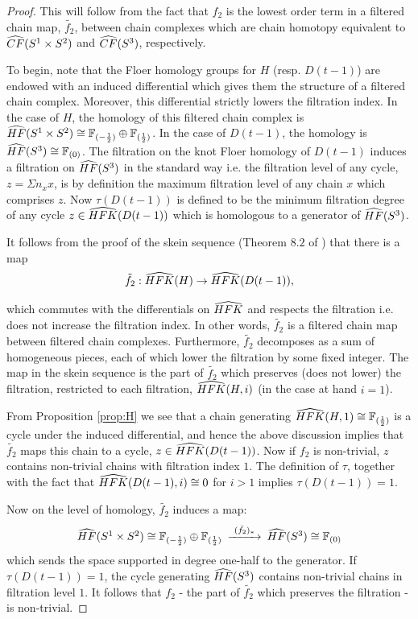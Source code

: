 \begin{proof} This will follow from the fact that $f_2$ is the lowest order term in a filtered chain map, $\tilde{f_2}$, between chain complexes which are chain homotopy equivalent to $\widehat{CF}(S^1\times S^2)$ and $\widehat{CF}(S^3)$, respectively.
	
To begin, note that the Floer homology groups for $H$ (resp. $D(t-1)$) are endowed with an induced differential which gives them the structure of a filtered chain complex. Moreover, this differential strictly lowers the filtration index. In the case of $H$, the homology of this filtered chain complex is  $\widehat{HF}(S^1\times S^2)\cong \mathbb F_{(-\frac{1}{2})}\oplus \mathbb F_{(\frac{1}{2})}$.  In the case of $D(t-1)$, the homology is $\widehat{HF}(S^3)\cong \mathbb F_{(0)}$.  The filtration on the knot Floer homology of $D(t-1)$ induces a filtration on $\widehat{HF}(S^3)$ in the standard way i.e. the filtration level of any cycle, $z = \Sigma n_x x$, is by definition the maximum filtration level of any chain $x$ which comprises $z$.   Now $\tau(D(t-1))$ is defined to be the minimum filtration degree of any cycle $z\in \widehat{HFK}(D(t-1))$ which is homologous to a generator of $\widehat{HF}(S^3)$.  

It follows from the proof of the skein sequence (Theorem $8.2$ of \cite{Knots}) that there is a map $$\tilde{f_2} :\widehat{HFK}(H) \rightarrow \widehat{HFK}(D(t-1)),$$

\noindent which commutes with the differentials on $\widehat{HFK}$ and respects the filtration i.e. does not increase the filtration index. In other words, $\tilde{f_2}$ is a filtered chain map between filtered chain complexes.  Furthermore, $\tilde{f_2}$ decomposes as a sum of homogeneous pieces, each of which lower the filtration by some fixed integer.  The map in the skein sequence is the part of $\tilde{f_2}$ which preserves (does not lower) the filtration, restricted to each filtration, $\widehat{HFK}(H,i)$ (in the case at hand $i=1$).  

From Proposition \ref{prop:H} we see that a chain generating $\widehat{HFK}(H,1)\cong \mathbb F_{(\frac{1}{2})}$  is a cycle under the induced differential, and hence the above discussion implies that $\tilde{f_2}$  maps this chain to a cycle,  $z\in \widehat{HFK}(D(t-1))$.  Now if $f_2$ is non-trivial, $z$ contains non-trivial chains with filtration index $1$.  The definition of $\tau$, together with the fact that $\widehat{HFK}(D(t-1),i)\cong 0$ for $i>1$ implies $\tau(D(t-1))=1$. 

Now on the level of homology, $\tilde{f_2}$ induces a map:  
$$
\begin{CD}
	\HFa(S^1\times S^2)\cong \F_{(-\OneHalf)}\oplus \F_{(\OneHalf)} @>{(\tilde{f_2})_*}>> 	\HFa(S^3)\cong \F_{(0)}  \\
\end{CD}
$$
\noindent which sends the space supported in degree one-half to the generator.  If $\tau(D(t-1))=1$, the cycle  generating $\widehat{HF}(S^3)$  contains non-trivial chains in filtration level $1$.  It follows that $f_2$ - the part of $\tilde{f_2}$ which preserves the filtration - is non-trivial.  


\end{proof}
